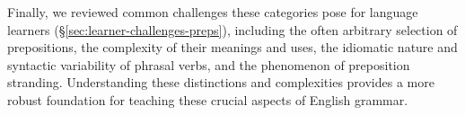 Finally, we reviewed common challenges these categories pose for language learners (\S\ref{sec:learner-challenges-preps}), including the often arbitrary selection of prepositions, the complexity of their meanings and uses, the idiomatic nature and syntactic variability of phrasal verbs, and the phenomenon of preposition stranding. Understanding these distinctions and complexities provides a more robust foundation for teaching these crucial aspects of English grammar.
